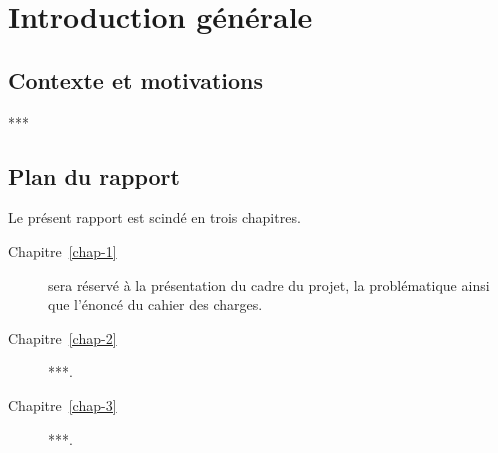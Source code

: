 \chapter*{Introduction générale}
{}

\section*{Contexte et motivations}
***

\section*{Plan du rapport}
Le présent rapport est scindé en trois chapitres.

\begin{description}
	\item[Chapitre~\ref{chap-1}] sera réservé à la présentation du cadre du projet, la problématique ainsi que l'énoncé du cahier des charges.
	\item[Chapitre~\ref{chap-2}] ***.
	\item[Chapitre~\ref{chap-3}] ***.
\end{description}